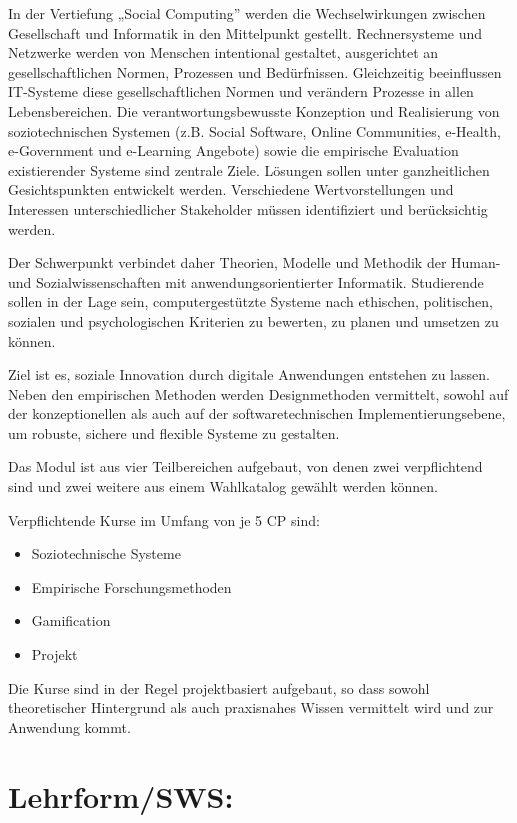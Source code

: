 In der Vertiefung „Social Computing'' werden die Wechselwirkungen
zwischen Gesellschaft und Informatik in den Mittelpunkt gestellt.
Rechnersysteme und Netzwerke werden von Menschen intentional gestaltet,
ausgerichtet an gesellschaftlichen Normen, Prozessen und Bedürfnissen.
Gleichzeitig beeinflussen IT-Systeme diese gesellschaftlichen Normen und
verändern Prozesse in allen Lebensbereichen. Die verantwortungsbewusste
Konzeption und Realisierung von soziotechnischen Systemen (z.B. Social
Software, Online Communities, e-Health, e-Government und e-Learning
Angebote) sowie die empirische Evaluation existierender Systeme sind
zentrale Ziele. Lösungen sollen unter ganzheitlichen Gesichtspunkten
entwickelt werden. Verschiedene Wertvorstellungen und Interessen
unterschiedlicher Stakeholder müssen identifiziert und berücksichtig
werden.

Der Schwerpunkt verbindet daher Theorien, Modelle und Methodik der
Human- und Sozialwissenschaften mit anwendungsorientierter Informatik.
Studierende sollen in der Lage sein, computergestützte Systeme nach
ethischen, politischen, sozialen und psychologischen Kriterien zu
bewerten, zu planen und umsetzen zu können.

Ziel ist es, soziale Innovation durch digitale Anwendungen entstehen zu
lassen. Neben den empirischen Methoden werden Designmethoden vermittelt,
sowohl auf der konzeptionellen als auch auf der softwaretechnischen
Implementierungsebene, um robuste, sichere und flexible Systeme zu
gestalten.

Das Modul ist aus vier Teilbereichen aufgebaut, von denen zwei
verpflichtend sind und zwei weitere aus einem Wahlkatalog gewählt werden
können.

Verpflichtende Kurse im Umfang von je 5 CP sind:

\begin{itemize}
\tightlist
\item
  Soziotechnische Systeme
\item
  Empirische Forschungsmethoden
\item
  Gamification
\item
  Projekt
\end{itemize}

Die Kurse sind in der Regel projektbasiert aufgebaut, so dass sowohl
theoretischer Hintergrund als auch praxisnahes Wissen vermittelt wird
und zur Anwendung kommt.

\section*{Lehrform/SWS:}\label{lehrformsws-27}

